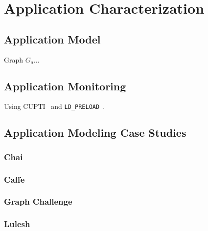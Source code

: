 \chapter{Application Characterization}

\section{Application Model}

Graph $G_a$...

\section{Application Monitoring}

Using CUPTI~\cite{nvidia2017cupti} and \texttt{LD\_PRELOAD}~\cite{kerrisk2017ld}.

\section{Application Modeling Case Studies}
\subsection{Chai}
\subsection{Caffe}
\subsection{Graph Challenge}
\subsection{Lulesh}